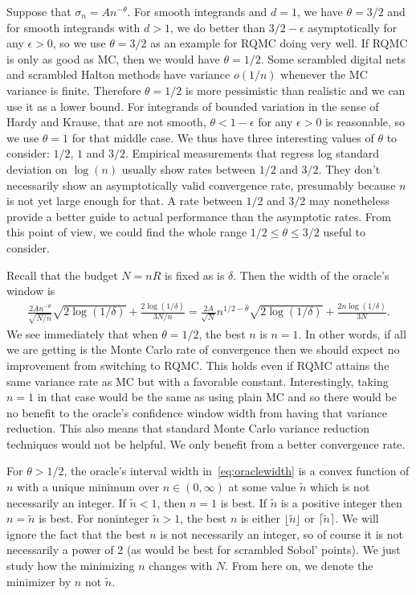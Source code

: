 \documentclass{article}
\renewcommand{\le}{\leqslant}
\begin{document}
Suppose that $\sigma_n = An^{-\theta}$.  For smooth integrands
and $d=1$, we have $\theta=3/2$ and for smooth integrands with $d>1$, we do better than $3/2-\epsilon$ asymptotically for any $\epsilon>0$, so we use $\theta=3/2$ as an example for RQMC doing very well. If RQMC is only as good as MC, then we would have $\theta=1/2$. Some scrambled digital nets and scrambled Halton methods have variance $o(1/n)$ whenever the MC variance is finite. Therefore $\theta=1/2$ is more pessimistic than realistic and we can use it as a lower bound. For integrands of bounded
variation in the sense of Hardy and Krause, that are not smooth, $\theta<1-\epsilon$ for any $\epsilon>0$ is reasonable, so we use $\theta=1$ for that middle case.  We thus have three interesting values of $\theta$ to consider: $1/2$, $1$ and $3/2$.  Empirical measurements that regress log standard deviation on $\log(n)$ usually show rates between $1/2$ and $3/2$.  They don't necessarily show an asymptotically valid convergence rate, presumably because $n$ is not yet large enough for that.  A rate between $1/2$ and $3/2$ may nonetheless provide a better guide to actual performance than the asymptotic rates. From this point of view, we could find the whole range $1/2\le \theta\le3/2$ useful to consider.

Recall that the budget $N=nR$ is fixed as is $\delta$.
Then the width  of the oracle's window is
\begin{align}\label{eq:oraclewidth}
\frac{2An^{-\theta}}{\sqrt{N/n}}\sqrt{2\log(1/\delta)}  + \frac{2\log(1/\delta)}{3N/n}
=\frac{2A}{\sqrt{N}}n^{1/2-\theta}\sqrt{2\log(1/\delta)}  + \frac{2n\log(1/\delta)}{3N}.
\end{align}
We see immediately that when $\theta = 1/2$, the best $n$ is $n=1$. In other words, if all we are getting is the Monte Carlo rate of convergence then we should expect no improvement from switching to RQMC.  This holds even if RQMC attains the same variance rate as MC but with a favorable constant.  Interestingly, taking $n=1$ in that case would be the same as using plain MC and so there would be no benefit to the oracle's confidence window width from having that variance reduction.  This also means that standard Monte Carlo variance reduction techniques would not be helpful.  We only benefit from a better convergence rate.

For $\theta>1/2$, the oracle's interval width in~\eqref{eq:oraclewidth} is a convex function of $n$ with a unique minimum over $n\in(0,\infty)$ at some value $\tilde n$ which is not necessarily an integer.  
If $\tilde n<1$, then $n=1$ is best.  If $\tilde n$ is a positive
integer then $n=\tilde n$ is best. For noninteger $\tilde n >1$,
the best $n$ is either $\lfloor \tilde n\rfloor$
or  $\lceil \tilde n\rceil$.  We will ignore the fact that the best $n$ is not
necessarily an integer, so of course it is not necessarily a power of 2 (as would be best for scrambled Sobol' points). We just study how the minimizing $n$ changes with $N$.  From here on, we denote the minimizer by $n$ not $\tilde n$.
\end{document}
